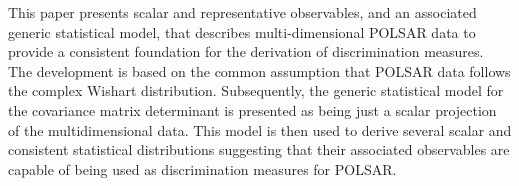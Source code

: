 \documentclass[journal]{IEEEtran}
\begin{document}
This paper presents scalar and representative observables,
   and an associated generic statistical model,
   that describes multi-dimensional POLSAR data to provide a consistent foundation for the derivation of discrimination measures.   
The development is based on the common assumption that POLSAR data follows the complex Wishart distribution.  
Subsequently, the generic statistical model for the covariance matrix determinant is presented as being just a scalar projection of the multidimensional data.
This model is then used to derive several scalar and consistent statistical distributions suggesting that their associated observables are capable of being used as discrimination measures for POLSAR.
%
\end{document}
